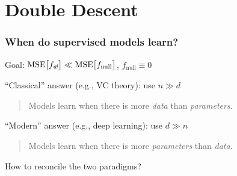 \section{Double Descent}

      
        

\begin{frame}
  \frametitle{When do supervised models learn?}
  
  Goal: ${\mathrm{MSE}\big[f_{\vec{w}}\big]} \ll {\mathrm{MSE}\big[f_{\mathrm{null}}\big]}$,  $f_{\mathrm{null}}\equiv 0$

  
``Classical'' answer (e.g., VC theory): use $n \gg d$
  \begin{quote}
    Models learn when there is more \emph{data} than \emph{parameters}.
  \end{quote}
  
  \vspace{5mm}

  
``Modern'' answer (e.g., deep learning): use $d \gg n$
  \begin{quote}
    Models learn when there is more \emph{parameters} than \emph{data}.
  \end{quote}

  \vspace{5mm}

  How to reconcile the two paradigms?
\end{frame}

